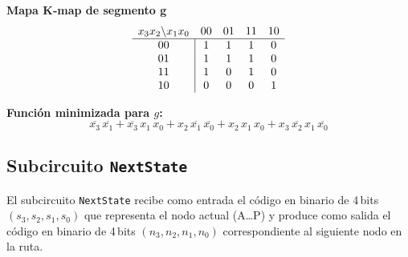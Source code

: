 \documentclass[12pt]{article}
\begin{document}
\noindent
\textbf{Mapa K‐map de segmento \textsf{g}}  
\[
\begin{array}{c|cccc}
\multicolumn{1}{c}{x_3x_2 \backslash x_1x_0} & 00 & 01 & 11 & 10 \\
\hline
00 & 1 & 1 & 1 & 0 \\
01 & 1 & 1 & 1 & 0 \\
11 & 1 & 0 & 1 & 0 \\
10 & 0 & 0 & 0 & 1 \\
\end{array}
\]
\vspace{1em}

\noindent
\textbf{Función minimizada para \(g\):}
\[
\overline{x_3}\,\overline{x_1} + \overline{x_3}\,x_1\,x_0 + x_2\,\overline{x_1}\,\overline{x_0} + x_2\,x_1\,x_0 + x_3\,\overline{x_2}\,x_1\,\overline{x_0}
\]

\newpage


\subsection{Subcircuito \texttt{NextState}}

El subcircuito \texttt{NextState} recibe como entrada el código en binario de 4\,bits  
\((s_{3},s_{2},s_{1},s_{0})\) que representa el nodo actual (A…P) y produce como salida  
el código en binario de 4\,bits \((n_{3},n_{2},n_{1},n_{0})\) correspondiente al siguiente nodo en la ruta. 
\end{document}
